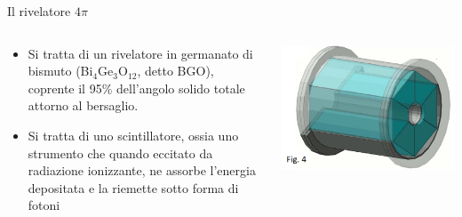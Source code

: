 \documentclass [xcolor=svgnames] {beamer}
\begin{document}
	\begin{frame}{Il rivelatore $4\pi$}
	\begin{columns}
		\begin{column}{0.45\textwidth}
			\begin{itemize}
				\item Si tratta di un rivelatore in germanato di bismuto (Bi$_{4}$Ge$_{3}$O$_{12}$, detto BGO), coprente il 95\% dell'angolo solido totale attorno al bersaglio.
				\item Si tratta di uno scintillatore, ossia uno strumento che quando eccitato da radiazione ionizzante, ne assorbe l'energia depositata e la riemette sotto forma di fotoni
			\end{itemize}
		\end{column}
		\begin{column}{0.45\textwidth}
			\centering
			\includegraphics[width=\textwidth]{img/bgo_3d.png}
		\end{column}
	\end{columns}
	
\end{frame}
\end{document}
